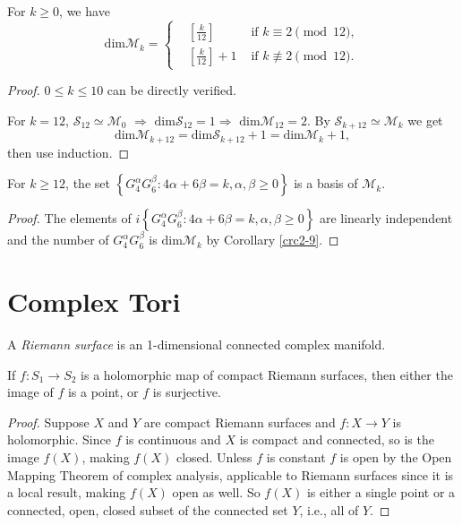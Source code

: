 \begin{corollary}\label{crc2-9}
  For $k\ge 0$, we have
  \[
  \mathrm{dim}\mathcal{M}_k=\left\{
    \begin{aligned}
      &\left[ \frac{k}{12} \right] &  \text{ if }k\equiv 2 \pmod{12},\\
      &\left[ \frac{k}{12} \right]+1 & \text{ if }k\not\equiv 2\pmod{12}. 
    \end{aligned}\right.
  \]
  \begin{proof}
    $0\le k\le 10$ can be directly verified.

    For $k=12$,  $\mathcal{S}_{12}\simeq \mathcal{M}_0$ $\Rightarrow$ $\mathrm{dim}\mathcal{S}_12=1$$\Rightarrow$ $\mathrm{dim}\mathcal{M}_{12}=2$. By $\mathcal{S}_{k+12}\simeq \mathcal{M}_{k}$ we get 
    \[
    \mathrm{dim}\mathcal{M}_{k+12}=\mathrm{dim}\mathcal{S}_{k+12}+1=\mathrm{dim}\mathcal{M}_k+1,
    \] 
    then use induction.
  \end{proof}
\end{corollary}

\begin{corollary}
  For $k\ge 12$, the set $\left\{G_4^{\alpha}G_6^{\beta}: 4\alpha+6\beta=k,\alpha,\beta\ge 0\right\}$ is a basis of $\mathcal{M}_k$.
\end{corollary}
\begin{proof}
  The elements of $i\left\{G_4^{\alpha}G_6^{\beta}:4\alpha+6\beta=k,\alpha,\beta\ge 0\right\} $ are linearly independent and the number of $G_4^{\alpha}G_6^{\beta}$ is $\mathrm{dim}\mathcal{M}_k$ by Corollary \ref{crc2-9}.
\end{proof}
\section{Complex Tori}
A \textit{Riemann surface} is an 1-dimensional connected complex manifold.
\begin{proposition}
  If $f:S_1\to S_2$ is a holomorphic map of compact Riemann surfaces, then either the image of $f$ is a point, or $f$ is surjective.
\end{proposition}
\begin{proof}
  Suppose $X$ and $Y$ are compact Riemann surfaces and $f:X\to Y$ is holomorphic. Since $f$ is continuous and $X$ is compact and connected, so is the image $f(X)$, making $f(X)$ closed. Unless $f$ is constant $f$ is open by the Open Mapping Theorem of complex analysis, applicable to Riemann surfaces since it is a local result, making $f(X)$ open as well. So $f(X)$ is either a single point or a connected, open, closed subset of the connected set $Y$, i.e., all of $Y$.
\end{proof}

